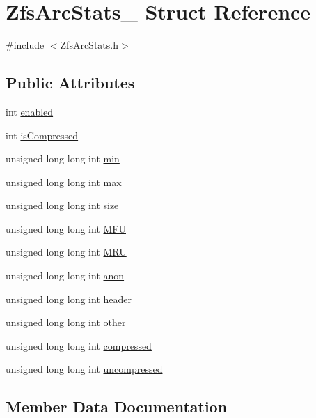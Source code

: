 \hypertarget{structZfsArcStats__}{}\section{Zfs\+Arc\+Stats\+\_\+ Struct Reference}
\label{structZfsArcStats__}


{\ttfamily \#include $<$Zfs\+Arc\+Stats.\+h$>$}

\subsection*{Public Attributes}
\begin{DoxyCompactItemize}
\item 
int \hyperlink{structZfsArcStats___a79c663648b66c65eacc681e31a8662df}{enabled}
\item 
int \hyperlink{structZfsArcStats___ab1522ac72c394515e8ae6e8f18daaf79}{is\+Compressed}
\item 
unsigned long long int \hyperlink{structZfsArcStats___a50578029c37874a9e01c1f1c7ad1923a}{min}
\item 
unsigned long long int \hyperlink{structZfsArcStats___ab0f3aaf8e90a749a553490487f716ea5}{max}
\item 
unsigned long long int \hyperlink{structZfsArcStats___a787dc732d92c75d02c260fa75004b078}{size}
\item 
unsigned long long int \hyperlink{structZfsArcStats___a5723625c7486d8496a46eafa6aab66e9}{M\+FU}
\item 
unsigned long long int \hyperlink{structZfsArcStats___a3cc57fe123a31f0f56d66c2724be3d5f}{M\+RU}
\item 
unsigned long long int \hyperlink{structZfsArcStats___a909060cbf931a17beed61c36591eb5d9}{anon}
\item 
unsigned long long int \hyperlink{structZfsArcStats___a850b77719247976766d414ef8f67b3a1}{header}
\item 
unsigned long long int \hyperlink{structZfsArcStats___a93fe1a35fe7f89bf5edd77a7d02efb2f}{other}
\item 
unsigned long long int \hyperlink{structZfsArcStats___a7efe5e6813b71ba05a50eb4a1649b2dd}{compressed}
\item 
unsigned long long int \hyperlink{structZfsArcStats___a7371a55d8f26dbeb5846ab62fd0b37c3}{uncompressed}
\end{DoxyCompactItemize}


\subsection{Member Data Documentation}
\mbox{\label{structZfsArcStats___a909060cbf931a17beed61c36591eb5d9}} 
